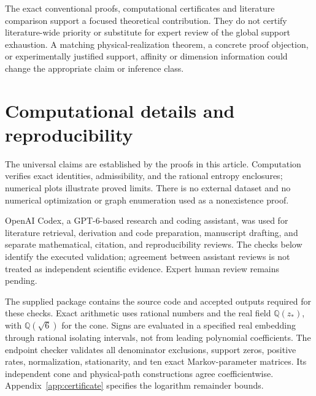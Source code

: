 \documentclass[aps,pre,onecolumn,11pt,longbibliography,notitlepage]{revtex4-2}
\newcommand{\1}{\mathbf 1}
\newcommand{\zs}{z_*}
\begin{document}
The exact conventional proofs, computational certificates and literature comparison support a focused theoretical contribution. They do not certify literature-wide priority or substitute for expert review of the global support exhaustion. A matching physical-realization theorem, a concrete proof objection, or experimentally justified support, affinity or dimension information could change the appropriate claim or inference class.

\section{Computational details and reproducibility}\label{sec:methods}
The universal claims are established by the proofs in this article. Computation verifies exact identities, admissibility, and the rational entropy enclosures; numerical plots illustrate proved limits. There is no external dataset and no numerical optimization or graph enumeration used as a nonexistence proof.

OpenAI Codex, a GPT-6-based research and coding assistant, was used for literature retrieval, derivation and code preparation, manuscript drafting, and separate mathematical, citation, and reproducibility reviews. The checks below identify the executed validation; agreement between assistant reviews is not treated as independent scientific evidence. Expert human review remains pending.

The supplied package contains the source code and accepted outputs required for these checks. Exact arithmetic uses rational numbers and the real field $\mathbb Q(\zs)$, with $\mathbb Q(\sqrt6)$ for the cone. Signs are evaluated in a specified real embedding through rational isolating intervals, not from leading polynomial coefficients. The endpoint checker validates all denominator exclusions, support zeros, positive rates, normalization, stationarity, and ten exact Markov-parameter matrices. Its independent cone and physical-path constructions agree coefficientwise. Appendix~\ref{app:certificate} specifies the logarithm remainder bounds.
\end{document}
